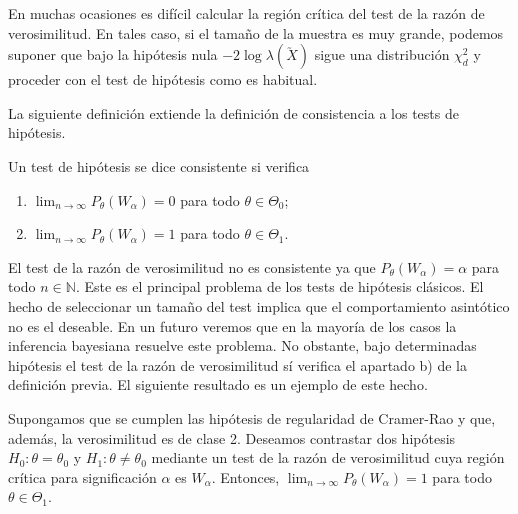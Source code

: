        En muchas ocasiones es difícil calcular la región crítica del test de la razón de verosimilitud. En tales caso, si el tamaño de la muestra es muy grande, podemos suponer que bajo la hipótesis nula $-2 \log \lambda(\utilde{X})$ sigue una distribución $\chi_d^2$ y proceder con el test de hipótesis como es habitual.

        La siguiente definición extiende la definición de consistencia a los tests de hipótesis.

        \begin{definition}
            Un test de hipótesis se dice consistente si verifica
            \begin{enumerate}
                \item $\lim_{n \to \infty} P_{\theta}(W_\alpha) = 0$ para todo $\theta \in \Theta_0$;
                \item $\lim_{n \to \infty} P_{\theta}(W_\alpha) = 1$ para todo $\theta \in \Theta_1$.
            \end{enumerate}
        \end{definition}

        El test de la razón de verosimilitud no es consistente ya que $P_{\theta}(W_\alpha) = \alpha$ para todo $n \in \mathbb{N}$. Este es el principal problema de los tests de hipótesis clásicos. El hecho de seleccionar un tamaño del test implica que el comportamiento asintótico no es el deseable. En un futuro veremos que en la mayoría de los casos la inferencia bayesiana resuelve este problema. No obstante, bajo determinadas hipótesis el test de la razón de verosimilitud sí verifica el apartado b) de la definición previa. El siguiente resultado es un ejemplo de este hecho.

        \begin{prop}
            Supongamos que se cumplen las hipótesis de regularidad de Cramer-Rao y que, además, la verosimilitud es de clase 2. Deseamos contrastar dos hipótesis $H_0: \theta = \theta_0$ y $H_1: \theta \ne \theta_0$ mediante un test de la razón de verosimilitud cuya región crítica para significación $\alpha$ es $W_\alpha$. Entonces, $\lim_{n \to \infty} P_{\theta}(W_\alpha) = 1$ para todo $\theta \in \Theta_1$.
        \end{prop}

